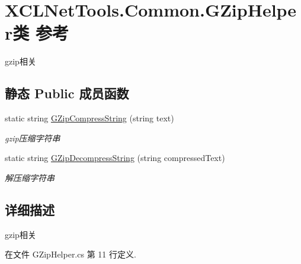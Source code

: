 \hypertarget{class_x_c_l_net_tools_1_1_common_1_1_g_zip_helper}{\section{X\-C\-L\-Net\-Tools.\-Common.\-G\-Zip\-Helper类 参考}
\label{class_x_c_l_net_tools_1_1_common_1_1_g_zip_helper}
}


gzip相关  


\subsection*{静态 Public 成员函数}
\begin{DoxyCompactItemize}
\item 
static string \hyperlink{class_x_c_l_net_tools_1_1_common_1_1_g_zip_helper_ad3914d0de1ee45b5927c5cf242fd9893}{G\-Zip\-Compress\-String} (string text)
\begin{DoxyCompactList}\small\item\em gzip压缩字符串 \end{DoxyCompactList}\item 
static string \hyperlink{class_x_c_l_net_tools_1_1_common_1_1_g_zip_helper_a1bc9a866216b7c947e6c4aea6c8fef3d}{G\-Zip\-Decompress\-String} (string compressed\-Text)
\begin{DoxyCompactList}\small\item\em 解压缩字符串 \end{DoxyCompactList}\end{DoxyCompactItemize}


\subsection{详细描述}
gzip相关 



在文件 G\-Zip\-Helper.\-cs 第 11 行定义.



